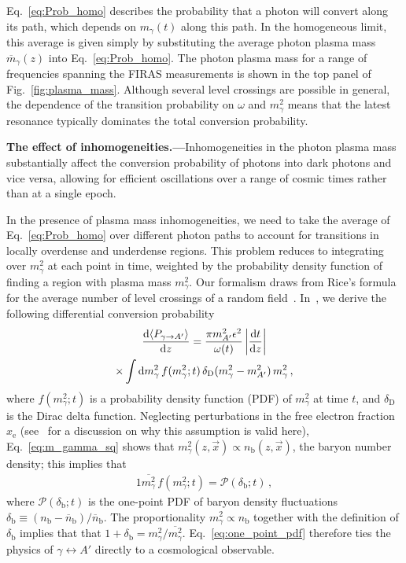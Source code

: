 \documentclass[prd,aps,10pt,nofootinbib,twocolumn,superscriptaddress,preprintnumbers,balancelastpage,longbibliography]{revtex4-1}
\begin{document}
Eq.~\eqref{eq:Prob_homo} describes the probability that a photon will convert along its path, which depends on $m_\gamma(t)$ along this path.  In the homogeneous limit, this average is given simply by substituting the average photon plasma mass $\overline m_\gamma(z)$ into Eq.~\eqref{eq:Prob_homo}.  The photon plasma mass for a range of frequencies spanning the FIRAS measurements is shown in the top panel of Fig.~\ref{fig:plasma_mass}. Although several level crossings are possible in general, the dependence of the transition probability on $\omega$ and $m_\gamma^2$ means that the latest resonance typically dominates the total conversion probability. 

\noindent
{\bf The effect of inhomogeneities.---}Inhomogeneities in the photon plasma mass substantially affect the conversion probability of photons into dark photons and vice versa, allowing for efficient oscillations over a range of cosmic times rather than at a single epoch.

In the presence of plasma mass inhomogeneities, we need to take the average of Eq.~\eqref{eq:Prob_homo} over different photon paths to account for transitions in locally overdense and underdense regions. This problem reduces to integrating over $m_\gamma^2$ at each point in time, weighted by the probability density function of finding a region with plasma mass $m_\gamma^2$. Our formalism draws from Rice's formula for the average number of level crossings of a random field~\cite{1944BSTJ...23..282R,lindgren2012stationary}. In~, we derive the following differential conversion probability
%
\begin{multline} 
    \label{eq:prob}
    \frac{\mathrm{d}\langle P_{\gamma \to A'} \rangle}{\mathrm{d} z} =  \frac{\pi m_{A^\prime}^2 \epsilon^2}{\omega(t)} \left|\frac{\mathrm{d} t}{\mathrm{d} z}\right| \\ \times  \int \mathrm{d} m_\gamma^2  \, f(m_\gamma^2;t) \, \delta_\mathrm{D}(m_\gamma^2 - m_{A^\prime}^2) \, m_\gamma^2  \,,
\end{multline}
%
where $f(m_\gamma^2;t)$ is a probability density function (PDF) of $m_\gamma^2$ at time $t$, and $\delta_\mathrm{D}$ is the Dirac delta function. Neglecting perturbations in the free electron fraction $x_\mathrm{e}$ (see~ for a discussion on why this assumption is valid here), Eq.~\eqref{eq:m_gamma_sq} shows that $m_\gamma^2(z,\vec{x}) \propto n_\mathrm{b}(z,\vec{x})$, the baryon number density; this implies that
%
\begin{alignat}{1}
    \overline{m_\gamma^2} \, f(m_\gamma^2; t) = \mathcal{P}(\delta_\mathrm{b};t) \,,
    \label{eq:one_point_pdf}
\end{alignat}
%
where $\mathcal{P}(\delta_\mathrm{b};t)$ is the one-point PDF of baryon density fluctuations $\delta_\mathrm{b} \equiv (n_\mathrm{b} - \overline{n}_\mathrm{b}) / \overline{n}_\mathrm{b}$. The proportionality $m_\gamma^2 \propto n_\mathrm{b}$ together with the definition of $\delta_\mathrm{b}$ implies that that $1 + \delta_\mathrm{b} = m_\gamma^2 / \overline{m_\gamma^2}$. Eq.~\eqref{eq:one_point_pdf} therefore ties the physics of $\gamma \leftrightarrow A'$ directly to a cosmological observable.
\end{document}
